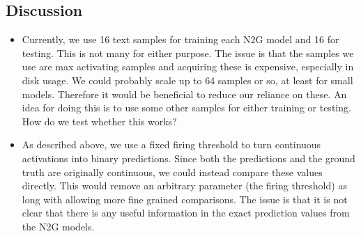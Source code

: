\documentclass[main.tex]{subfiles}
\begin{document}
\subsection{Discussion}
\begin{itemize}
    \item Currently, we use 16 text samples for training each N2G model 
    and 16 for testing.
    This is not many for either purpose.
    The issue is that the samples we use are max activating samples 
    and acquiring these is expensive, especially in disk usage.
    We could probably scale up to 64 samples or so, 
    at least for small models.
    Therefore it would be beneficial to reduce our reliance on these.
    An idea for doing this is to use some other samples for either 
    training or testing.
    How do we test whether this works?
    \item As described above, we use a fixed firing threshold 
    to turn continuous activations into binary predictions.
    Since both the predictions and the ground truth 
    are originally continuous, 
    we could instead compare these values directly.
    This would remove an arbitrary parameter (the firing threshold) 
    as long with allowing more fine grained comparisons.
    The issue is that it is not clear that there is any useful information 
    in the exact prediction values from the N2G models.
\end{itemize}


\nocite{foote_neuron_2023}
\end{document}
